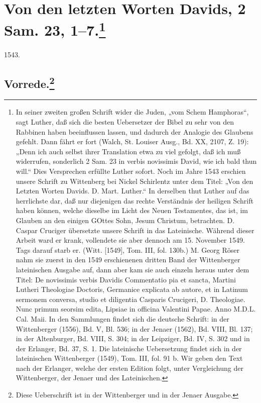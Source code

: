 \chapter[Von den letzten Worten Davids, 2 Sam. 23, 1–7]{Von den letzten Worten Davids, 2 Sam. 23, 1–7.\footnote{In seiner zweiten großen Schrift wider die Juden, „vom Schem Hamphoras“, sagt Luther, daß sich die besten Uebersetzer der Bibel zu sehr von den Rabbinen haben beeinflussen lassen, und dadurch der Analogie des Glaubens gefehlt. Dann fährt er fort (Walch, St. Louiser Ausg., Bd. XX, 2107, Z. 19): „Denn ich auch selbst ihrer Translation etwa zu viel gefolgt, daß ich muß widerrufen, sonderlich 2 Sam. 23 in verbis novissimis David, wie ich bald thun will.“ Dies Versprechen erfüllte Luther sofort. Noch im Jahre 1543 erschien unsere Schrift zu Wittenberg bei Nickel Schirlentz unter dem Titel: „Von den Letzten Worten Davids. D. Mart. Luther.“ In derselben thut Luther auf das herrlichste dar, daß nur diejenigen das rechte Verständnis der heiligen Schrift haben können, welche dieselbe im Licht des Neuen Testamentes, das ist, im Glauben an den einigen GOttes Sohn, Jesum Christum, betrachten. D. Caspar Cruciger übersetzte unsere Schrift in das Lateinische. Während dieser Arbeit ward er krank, vollendete sie aber dennoch am 15. November 1549. Tags darauf starb er. (Witt. [1549], Tom. III, fol. 130b.) M. Georg Röser nahm sie zuerst in den 1549 erschienenen dritten Band der Wittenberger lateinischen Ausgabe auf, dann aber kam sie auch einzeln heraus unter dem Titel: De novissimis verbis Davidis Commentatio pia et sancta, Martini Lutheri Theologiae Doctoris, Germanice explicata ab autore, et in Latinum sermonem conversa, studio et diligentia Casparis Crucigeri, D. Theologiae. Nunc primum seorsim edita, Lipsiae in officina Valentini Papae. Anno M.D.L. Cal. Maii. In den Sammlungen findet sich die deutsche Schrift: in der Wittenberger (1556), Bd. V, Bl. 536; in der Jenaer (1562), Bd. VIII, Bl. 137; in der Altenburger, Bd. VIII, S. 304; in der Leipziger, Bd. IV, S. 302 und in der Erlanger, Bd. 37, S. 1. Die lateinische Uebersetzung findet sich in der lateinischen Wittenberger (1549), Tom. III, fol. 91 b. Wir geben den Text nach der Erlanger, welche der ersten Edition folgt, unter Vergleichung der Wittenberger, der Jenaer und des Lateinischen.}}

1543.

\section[Vorrede]{Vorrede.\footnote{Diese Ueberschrift ist in der Wittenberger und in der Jenaer Ausgabe.}}

